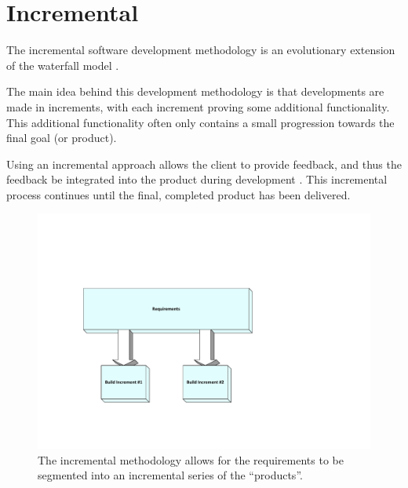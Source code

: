 \section{Incremental}
The incremental software development methodology is an evolutionary extension 
of the waterfall model \citep{pressman09}. 

The main idea behind this development methodology is that developments are made
in increments, with each increment proving some additional functionality. This
additional functionality often only contains a small progression towards the 
final goal (or product).

Using an incremental approach allows the client to provide feedback, and thus 
the feedback be integrated into the product during development 
\citep{elliott04}. This incremental process continues until the final, 
completed product has been delivered. 

\begin{figure}[H]
  \centering
  \vspace{-80pt}
  \includegraphics[width=\linewidth]{chapter6/incremental.pdf}
  \vspace{-60pt}
    \caption[Incremental methodology]
      {The incremental methodology allows for the requirements to be segmented 
      into an incremental series of the ``products''.}
\end{figure}

